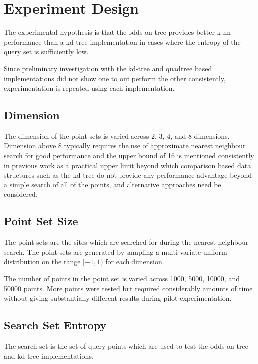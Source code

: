\documentclass[mcs]{scsthesis}
\begin{document}
\section{Experiment Design}

The experimental hypothesis is that the odds-on tree provides better k-nn
performance than a kd-tree implementation in cases where the entropy of the
query set is sufficiently low.

Since preliminary investigation with the kd-tree and quadtree based
implementations did not show one to out perform the other consistently, 
experimentation is repeated using each implementation. 

\subsection{Dimension}

The dimension of the point sets is varied across 2, 3, 4, and 8
dimensions. Dimension above 8 typically requires the use of approximate nearest
neighbour search for good performance \cite{app-ann} and the upper bound of 16
is mentioned consistently in previous work \cite{fastvector} as a practical
upper limit beyond which comparison based data structures such as the kd-tree do
not provide any performance advantage beyond a simple search of all of the
points, and alternative approaches need be considered.

\subsection{Point Set Size}

The point sets are the sites which are searched for during the nearest neighbour
search. The point sets are generated by sampling a multi-variate uniform
distribution on the range \([-1, 1)\) for each dimension.

The number of points in the point set is varied across 1000, 5000, 10000, and
50000 points. More points were tested but required considerably amounts of time
without giving substantially different results during pilot experimentation.

\subsection{Search Set Entropy}

The search set is the set of query points which are used to test the odds-on
tree and kd-tree implementations.
\end{document}

